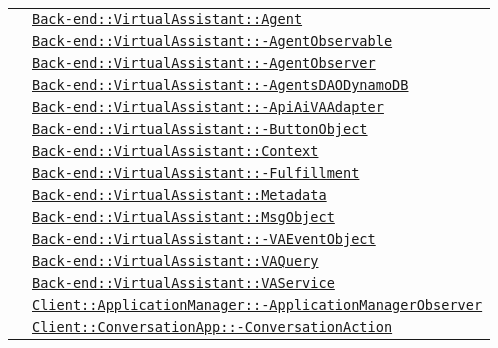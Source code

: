 \begin{longtable}{|>{\centering}m{3cm}|m{10cm}<{\centering}|}
& \hyperref[Back-end::VirtualAssistant::Agent]{\texttt{Back-end::VirtualAssistant::Agent}}\\
& \hyperref[Back-end::VirtualAssistant::AgentObservable]{\texttt{Back-end::VirtualAssistant::-\linebreak AgentObservable}}\\
& \hyperref[Back-end::VirtualAssistant::AgentObserver]{\texttt{Back-end::VirtualAssistant::-\linebreak AgentObserver}}\\
& \hyperref[Back-end::VirtualAssistant::AgentsDAODynamoDB]{\texttt{Back-end::VirtualAssistant::-\linebreak AgentsDAODynamoDB}}\\
& \hyperref[Back-end::VirtualAssistant::ApiAiVAAdapter]{\texttt{Back-end::VirtualAssistant::-\linebreak ApiAiVAAdapter}}\\
& \hyperref[Back-end::VirtualAssistant::ButtonObject]{\texttt{Back-end::VirtualAssistant::-\linebreak ButtonObject}}\\
& \hyperref[Back-end::VirtualAssistant::Context]{\texttt{Back-end::VirtualAssistant::Context}}\\
& \hyperref[Back-end::VirtualAssistant::Fulfillment]{\texttt{Back-end::VirtualAssistant::-\linebreak Fulfillment}}\\
& \hyperref[Back-end::VirtualAssistant::Metadata]{\texttt{Back-end::VirtualAssistant::Metadata}}\\
& \hyperref[Back-end::VirtualAssistant::MsgObject]{\texttt{Back-end::VirtualAssistant::MsgObject}}\\
& \hyperref[Back-end::VirtualAssistant::VAEventObject]{\texttt{Back-end::VirtualAssistant::-\linebreak VAEventObject}}\\
& \hyperref[Back-end::VirtualAssistant::VAQuery]{\texttt{Back-end::VirtualAssistant::VAQuery}}\\
& \hyperref[Back-end::VirtualAssistant::VAService]{\texttt{Back-end::VirtualAssistant::VAService}}\\
& \hyperref[Client::ApplicationManager::ApplicationManagerObserver]{\texttt{Client::ApplicationManager::-\linebreak ApplicationManagerObserver}}\\
& \hyperref[Client::ConversationApp::ConversationAction]{\texttt{Client::ConversationApp::-\linebreak ConversationAction}}\\

\end{longtable}
